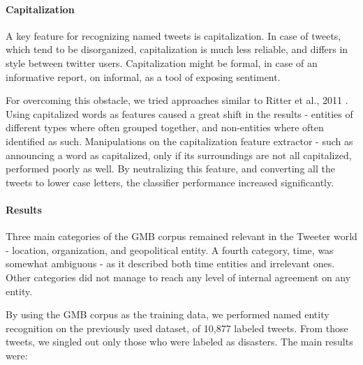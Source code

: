 \documentclass[letterpaper,twocolumn,10pt]{article}
\begin{document}
\paragraph{Capitalization} A key feature for recognizing named tweets is capitalization. In case of tweets, which tend to be disorganized, capitalization is much less reliable, and differs in style between twitter users. Capitalization might be formal, in case of an informative report, on informal, as a tool of exposing sentiment.

For overcoming this obstacle, we tried approaches similar to Ritter et al., 2011 \cite{Ritter11}. Using capitalized words as features caused a great shift in the results - entities of different types where often grouped together, and non-entities where often identified as such. Manipulations on the capitalization feature extractor - such as announcing a word as capitalized, only if its surroundings are not all capitalized, performed poorly as well. By neutralizing this feature, and converting all the tweets to lower case letters, the classifier performance increased significantly.

\paragraph{Results} Three main categories of the GMB corpus remained relevant in the Tweeter world - location, organization, and geopolitical entity. A fourth category, time, was somewhat ambiguous - as it described both time entities and irrelevant ones. Other categories did not manage to reach any level of internal agreement on any entity.

By using the GMB corpus as the training data, we performed named entity recognition on the previously used dataset, of 10,877 labeled tweets. From those tweets, we singled out only those who were labeled as disasters. The main results were:
\end{document}
